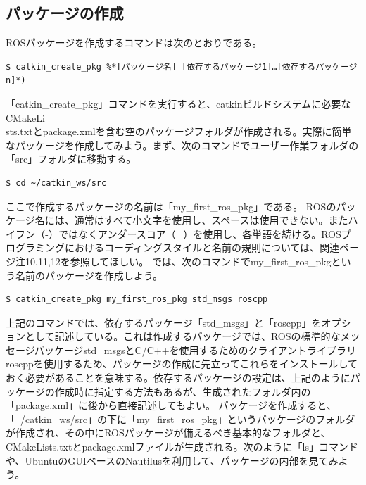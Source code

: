 \subsection{パッケージの作成}
ROSパッケージを作成するコマンドは次のとおりである。

\begin{lstlisting}[language=ROS]
$ catkin_create_pkg %*[パッケージ名] [依存するパッケージ1]…[依存するパッケージn]*)
\end{lstlisting}



「catkin\_create\_pkg」コマンドを実行すると、catkinビルドシステムに必要なCMakeLi\\sts.txtとpackage.xmlを含む空のパッケージフォルダが作成される。実際に簡単なパッケージを作成してみよう。まず、次のコマンドでユーザー作業フォルダの「src」フォルダに移動する。

\begin{lstlisting}[language=ROS]
$ cd ~/catkin_ws/src
\end{lstlisting}

ここで作成するパッケージの名前は「my\_first\_ros\_pkg」である。 ROSのパッケージ名には、通常はすべて小文字を使用し、スペースは使用できない。またハイフン（-）ではなくアンダースコア（\_）を使用し、各単語を続ける。ROSプログラミングにおけるコーディングスタイルと名前の規則については、関連ページ注10,11,12を参照してほしい。
では、次のコマンドでmy\_first\_ros\_pkgという名前のパッケージを作成しよう。

\begin{lstlisting}[language=ROS]
$ catkin_create_pkg my_first_ros_pkg std_msgs roscpp
\end{lstlisting}

上記のコマンドでは、依存するパッケージ「std\_msgs」と「roscpp」をオプションとして記述している。これは作成するパッケージでは、ROSの標準的なメッセージパッケージstd\_msgsとC/C++を使用するためのクライアントライブラリroscppを使用するため、パッケージの作成に先立ってこれらをインストールしておく必要があることを意味する。依存するパッケージの設定は、上記のようにパッケージの作成時に指定する方法もあるが、生成されたフォルダ内の「package.xml」に後から直接記述してもよい。
パッケージを作成すると、「~/catkin\_ws/src」の下に「my\_first\_ros\_pkg」というパッケージのフォルダが作成され、その中にROSパッケージが備えるべき基本的なフォルダと、CMakeLists.txtとpackage.xmlファイルが生成される。次のように「ls」コマンドや、UbuntuのGUIベースのNautilusを利用して、パッケージの内部を見てみよう。

